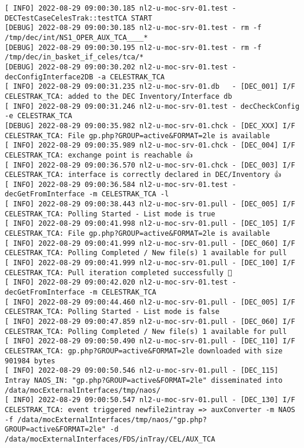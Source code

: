 \documentclass[dec_sum_main.tex]{subfiles}
\begin{document}
\begin{Verbatim}[fontsize=\tiny]
[ INFO] 2022-08-29 09:00:30.185 nl2-u-moc-srv-01.test - DECTestCaseCelesTrak::testTCA START
[DEBUG] 2022-08-29 09:00:30.185 nl2-u-moc-srv-01.test - rm -f /tmp/dec/int/NS1_OPER_AUX_TCA____*
[DEBUG] 2022-08-29 09:00:30.195 nl2-u-moc-srv-01.test - rm -f /tmp/dec/in_basket_if_celes/tca/*
[DEBUG] 2022-08-29 09:00:30.202 nl2-u-moc-srv-01.test - decConfigInterface2DB -a CELESTRAK_TCA
[ INFO] 2022-08-29 09:00:31.235 nl2-u-moc-srv-01.db   - [DEC_001] I/F CELESTRAK_TCA: added to the DEC Inventory/Interface db
[ INFO] 2022-08-29 09:00:31.246 nl2-u-moc-srv-01.test - decCheckConfig -e CELESTRAK_TCA
[DEBUG] 2022-08-29 09:00:35.982 nl2-u-moc-srv-01.chck - [DEC_XXX] I/F CELESTRAK_TCA: File gp.php?GROUP=active&FORMAT=2le is available
[ INFO] 2022-08-29 09:00:35.989 nl2-u-moc-srv-01.chck - [DEC_004] I/F CELESTRAK_TCA: exchange point is reachable 👍
[ INFO] 2022-08-29 09:00:36.570 nl2-u-moc-srv-01.chck - [DEC_003] I/F CELESTRAK_TCA: interface is correctly declared in DEC/Inventory 👍
[ INFO] 2022-08-29 09:00:36.584 nl2-u-moc-srv-01.test - decGetFromInterface -m CELESTRAK_TCA -l
[ INFO] 2022-08-29 09:00:38.443 nl2-u-moc-srv-01.pull - [DEC_005] I/F CELESTRAK_TCA: Polling Started - List mode is true
[ INFO] 2022-08-29 09:00:41.998 nl2-u-moc-srv-01.pull - [DEC_105] I/F CELESTRAK_TCA: File gp.php?GROUP=active&FORMAT=2le is available
[ INFO] 2022-08-29 09:00:41.999 nl2-u-moc-srv-01.pull - [DEC_060] I/F CELESTRAK_TCA: Polling Completed / New file(s) 1 available for pull
[ INFO] 2022-08-29 09:00:41.999 nl2-u-moc-srv-01.pull - [DEC_100] I/F CELESTRAK_TCA: Pull iteration completed successfully 🕺
[ INFO] 2022-08-29 09:00:42.020 nl2-u-moc-srv-01.test - decGetFromInterface -m CELESTRAK_TCA
[ INFO] 2022-08-29 09:00:44.460 nl2-u-moc-srv-01.pull - [DEC_005] I/F CELESTRAK_TCA: Polling Started - List mode is false
[ INFO] 2022-08-29 09:00:47.859 nl2-u-moc-srv-01.pull - [DEC_060] I/F CELESTRAK_TCA: Polling Completed / New file(s) 1 available for pull
[ INFO] 2022-08-29 09:00:50.490 nl2-u-moc-srv-01.pull - [DEC_110] I/F CELESTRAK_TCA: gp.php?GROUP=active&FORMAT=2le downloaded with size 901984 bytes
[ INFO] 2022-08-29 09:00:50.546 nl2-u-moc-srv-01.pull - [DEC_115] Intray NAOS_IN: "gp.php?GROUP=active&FORMAT=2le" disseminated into /data/mocExternalInterfaces/tmp/naos/
[ INFO] 2022-08-29 09:00:50.547 nl2-u-moc-srv-01.pull - [DEC_130] I/F CELESTRAK_TCA: event triggered newfile2intray => auxConverter -m NAOS -f /data/mocExternalInterfaces/tmp/naos/"gp.php?GROUP=active&FORMAT=2le" -d /data/mocExternalInterfaces/FDS/inTray/CEL/AUX_TCA

\end{Verbatim}
\end{document}

